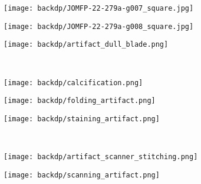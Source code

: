 \begin{figure}
  \centering
  \begin{subfigure}[t]{0.32\textwidth}
    \centering
    \texttt{[image: backdp/JOMFP-22-279a-g007\_square.jpg]}
    \caption{}
    \label{fig:backdp:artifacts:autolysis1}
  \end{subfigure}%
  \begin{subfigure}[t]{0.32\textwidth}
    \centering
    \texttt{[image: backdp/JOMFP-22-279a-g008\_square.jpg]}
    \caption{}
    \label{fig:backdp:artifacts:autolysis2}
  \end{subfigure}%
  \begin{subfigure}[t]{0.32\textwidth}
    \centering
    \texttt{[image: backdp/artifact\_dull\_blade.png]}
    \caption{}
    \label{fig:backdp:artifacts:microtomy1}
  \end{subfigure}\\

  \begin{subfigure}[t]{0.32\textwidth}
    \centering
    \texttt{[image: backdp/calcification.png]}
    \caption{}
    \label{fig:backdp:artifacts:microtomy2}
  \end{subfigure}%
  \begin{subfigure}[t]{0.32\textwidth}
    \centering
    \texttt{[image: backdp/folding\_artifact.png]}
    \caption{}
    \label{fig:backdp:artifacts:folding}
  \end{subfigure}%
  \begin{subfigure}[t]{0.32\textwidth}
    \centering
    \texttt{[image: backdp/staining\_artifact.png]}
    \caption{}
    \label{fig:backdp:artifacts:staining}
  \end{subfigure}\\

  \begin{subfigure}[t]{0.32\textwidth}
    \centering
    \texttt{[image: backdp/artifact\_scanner\_stitching.png]}
    \caption{}
    \label{fig:backdp:artifacts:scanning1}
  \end{subfigure}%
  \begin{subfigure}[t]{0.32\textwidth}
    \centering
    \texttt{[image: backdp/scanning\_artifact.png]}
    \caption{}
    \label{fig:backdp:artifacts:scanning2}
  \end{subfigure}%


\end{figure}
